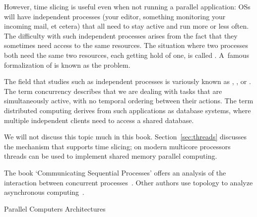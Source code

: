 However, time slicing is useful even when not running a parallel
application: \acp{OS} will have independent processes (your editor,
something monitoring your incoming mail, et cetera) that all need to
stay active and run more or less often. The difficulty with such
independent processes arises from the fact that they sometimes need
access to the same resources. The situation where two processes both
need the same two resources, each getting hold of one, is called
. A~famous formalization of
 is
known as the  problem.

The field that studies such as independent processes is variously
known as
,
, or
.
The term concurrency describes that we are dealing with tasks that are
simultaneously active, with no temporal ordering between their actions.
The term distributed computing derives from
such applications as database systems, where multiple independent clients need to
access a shared database. 

We will not discuss this topic much in this
book. Section~\ref{sec:threads} discusses the 
mechanism that supports time slicing; on modern multicore processors
threads can be used to implement shared memory parallel computing.

The book `Communicating Sequential
Processes' offers an analysis of the interaction between
concurrent processes~\cite{Hoare:CSP}. Other authors use topology to analyze
asynchronous computing~\cite{Herlihy:1999:topological}.

 {Parallel Computers Architectures}


